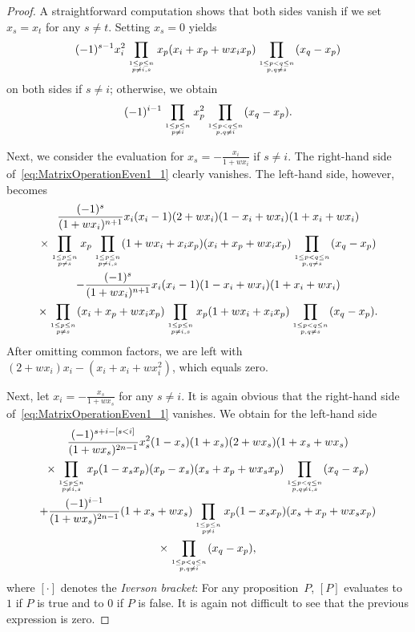 \documentclass[10pt,a4paper]{article}
\theoremstyle{definition}
\newcommand\myatop[2]{\genfrac{}{}{0pt}{}{#1}{#2}}
\begin{document}
\begin{proof}
		A straightforward computation shows that both sides vanish if we set $x_s=x_t$ for any $s \neq t$. Setting $x_s=0$ yields
		\begin{equation*}
			(-1)^{s-1} x_i^2 \prod_{\myatop{1 \le p \le n}{p \neq i,s}} x_p (x_i+x_p+w x_i x_p) \prod_{\myatop{1 \le p < q \le n}{p,q \neq s}} (x_q - x_p)
		\end{equation*}
		on both sides if $s \neq i$; otherwise, we obtain
		\begin{equation*}
			(-1)^{i-1}  \prod_{\myatop{1 \le p \le n}{p \neq i}} x_p^2 \prod_{\myatop{1 \le p < q \le n}{p,q \neq i}} (x_q - x_p).
		\end{equation*}
		
		Next, we consider the evaluation for $x_s=-\frac{x_i}{1+w x_i}$ if $s \neq i$. The right-hand side of~\eqref{eq:MatrixOperationEven1_1} clearly vanishes. The left-hand side, however, becomes
		\begin{multline*}
			\frac{(-1)^{s}}{(1+w x_i)^{n+1}} x_i (x_i-1)(2+ w x_i)(1-x_i+w x_i)(1+x_i+w x_i)\\
			\times \prod_{\myatop{1 \le p \le n}{p \neq s}} x_p \prod_{\myatop{1 \le p \le n}{p \neq i,s}} (1+w x_i+ x_i x_p)  (x_i+x_p+w x_i x_p) \prod_{\myatop{1 \le p < q \le n}{p,q \neq s}} (x_q - x_p)\\
			- \frac{(-1)^s}{(1+w x_i)^{n+1}} x_i (x_i-1) (1-x_i+w x_i)(1+x_i + w x_i)\\
			\times\prod_{\myatop{1 \le p \le n}{p \neq s}}  (x_i+x_p + w x_i x_p)  \prod_{\myatop{1 \le p \le n}{p \neq i,s}} x_p (1+ w x_i + x_i x_p) \prod_{\myatop{1 \le p <q \le n}{p,q \neq s}} (x_q -x_p).
		\end{multline*}
		After omitting common factors, we are left with $(2+ w x_i) x_i -  (x_i+x_i + w x_i^2)$, which equals zero. 
		
		Next, let $x_i=-\frac{x_s}{1+w x_s}$ for any $s \neq i$. It is again obvious that the right-hand side of~\eqref{eq:MatrixOperationEven1_1} vanishes. We obtain for the left-hand side
		\begin{multline*}
			\frac{(-1)^{s+i-\left[s<i\right]}}{(1+w x_s)^{2n-1}} x_s^2 (1-x_s) (1+x_s) (2+ w x_s)(1+x_s+w x_s)\\
			\times  \prod_{\myatop{1 \le p \le n}{p \neq i,s}}x_p (1-x_s x_p)  (x_p - x_s)  (x_s+x_p+w x_s x_p) \prod_{\myatop{1 \le p < q \le n}{p,q \neq i,s}} (x_q - x_p)\\
			+ \frac{(-1)^{i-1}}{(1+w x_s)^{2n-1}}  (1+x_s + w x_s)\prod_{\myatop{1 \le p \le n}{p \neq i}} x_p (1-x_s x_p) (x_s+x_p+w x_s x_p) \\
			\times \prod_{\myatop{1 \le p <q \le n}{p,q \neq i}} (x_q -x_p),
		\end{multline*}
		where $\left[\boldsymbol{\cdot}\right]$ denotes the \emph{Iverson bracket}: For any proposition~$P$, $\left[P\right]$ evaluates to $1$ if $P$ is true and to $0$ if $P$ is false. It is again not difficult to see that the previous expression is zero.
		

\end{proof}
\end{document}
